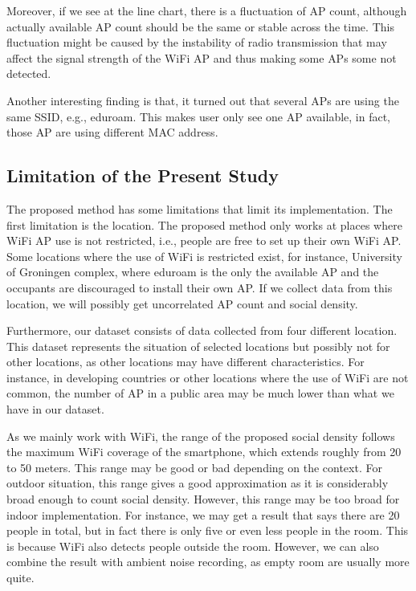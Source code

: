 	Moreover, if we see at the line chart, there is a fluctuation of \ac{AP} count, although actually available \ac{AP} count should be the same or stable across the time. This fluctuation might be caused by the instability of radio transmission that may affect the signal strength of the WiFi \ac{AP} and thus making some \ac{AP}s some not detected.
	
	Another interesting finding is that, it turned out that several \ac{AP}s are using the same \ac{SSID}, e.g., eduroam. This makes user only see one \ac{AP} available, in fact, those \ac{AP} are using different \ac{MAC} address.

	\subsection{Limitation of the Present Study}
	\label{sub:limitation_of_the_present_study}
	The proposed method has some limitations that limit its implementation.
	The first limitation is the location. The proposed method only works at places where WiFi \ac{AP} use is not restricted, i.e., people are free to set up their own WiFi AP. Some locations where the use of WiFi is restricted exist, for instance, University of Groningen complex, where eduroam is the only the available AP and the occupants are discouraged to install their own AP. If we collect data from this location, we will possibly get uncorrelated \ac{AP} count and social density.

	Furthermore, our dataset consists of data collected from four different location. This dataset represents the situation of selected locations but possibly not for other locations, as other locations may have different characteristics. For instance, in developing countries or other locations where the use of WiFi are not common, the number of \ac{AP} in a public area may be much lower than what we have in our dataset.

	As we mainly work with WiFi, the range of the proposed social density follows the maximum WiFi coverage of the smartphone, which extends roughly from 20 to 50 meters. This range may be good or bad depending on the context. For outdoor situation, this range gives a good approximation as it is considerably broad enough to count social density. However, this range may be too broad for indoor implementation. For instance, we may get a result that says there are 20 people in total, but in fact there is only five or even less people in the room. This is because WiFi also detects people outside the room. However, we can also combine the result with ambient noise recording, as empty room are usually more quite.

